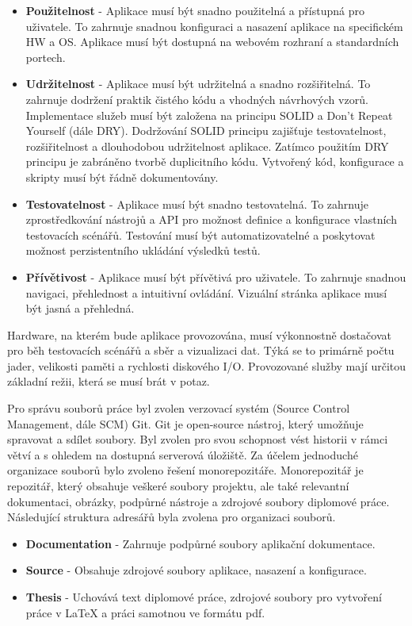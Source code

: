\begin{itemize}
  \item \textbf{Použitelnost} - Aplikace musí být snadno použitelná a přístupná pro uživatele. To zahrnuje snadnou konfiguraci a nasazení aplikace na specifickém HW a OS. Aplikace musí být dostupná na webovém rozhraní a standardních portech.
  \item \textbf{Udržitelnost} - Aplikace musí být udržitelná a snadno rozšiřitelná. To zahrnuje dodržení praktik čistého kódu a vhodných návrhových vzorů. Implementace služeb musí být založena na principu SOLID a Don't Repeat Yourself (dále DRY). Dodržování SOLID principu zajišťuje testovatelnost, rozšiřitelnost a dlouhodobou udržitelnost aplikace. Zatímco použitím DRY principu je zabráněno tvorbě duplicitního kódu. Vytvořený kód, konfigurace a skripty musí být řádně dokumentovány.
  \item \textbf{Testovatelnost} - Aplikace musí být snadno testovatelná. To zahrnuje zprostředkování nástrojů a API pro možnost definice a konfigurace vlastních testovacích scénářů. Testování musí být automatizovatelné a poskytovat možnost perzistentního ukládání výsledků testů.
  \item \textbf{Přívětivost} - Aplikace musí být přívětivá pro uživatele. To zahrnuje snadnou navigaci, přehlednost a intuitivní ovládání. Vizuální stránka aplikace musí být jasná a přehledná.
\end{itemize}


Hardware, na kterém bude aplikace provozována, musí výkonnostně dostačovat pro běh testovacích scénářů a sběr a vizualizaci dat. Týká se to primárně počtu jader, velikosti paměti a rychlosti diskového I/O. Provozované služby mají určitou základní režii, která se musí brát v potaz.


Pro správu souborů práce byl zvolen verzovací systém (Source Control Management, dále SCM) Git. Git je open-source nástroj, který umožňuje spravovat a sdílet soubory. Byl zvolen pro svou schopnost vést historii v rámci větví a s ohledem na dostupná serverová úložiště. Za účelem jednoduché organizace souborů bylo zvoleno řešení monorepozitáře. Monorepozitář je repozitář, který obsahuje veškeré soubory projektu, ale také relevantní dokumentaci, obrázky, podpůrné nástroje a zdrojové soubory diplomové práce. Následující struktura adresářů byla zvolena pro organizaci souborů.

\begin{itemize}
    \item \textbf{Documentation} - Zahrnuje podpůrné soubory aplikační dokumentace.
    \item \textbf{Source} - Obsahuje zdrojové soubory aplikace, nasazení a konfigurace.
    \item \textbf{Thesis} - Uchovává text diplomové práce, zdrojové soubory pro vytvoření práce v LaTeX a práci samotnou ve formátu pdf.
\end{itemize}

